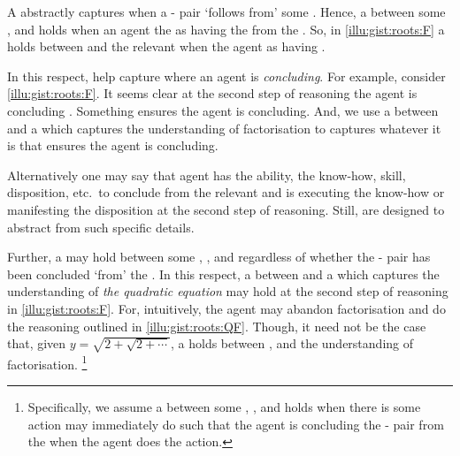 \begin{note}
  A \emph{} abstractly captures when a - pair `follows from' some \pool{}.
  Hence, a \ros{} between some ,  and  holds when an agent \eval{} the \prop{} as having the  from the .
  So, in \autoref{illu:gist:roots:F} a \ros{} holds between  and the relevant \pool{} when the agent \evals{} \propM{\rootsCon{}} as having  .

  In this respect,  help capture where an agent is \emph{concluding}.
  For example, consider \autoref{illu:gist:roots:F}.
  It seems clear at the second step of reasoning the agent is concluding .
  Something ensures the agent is concluding.
  And, we use a \ros{} between  and a \pool{} which captures the \agents{} understanding of factorisation to captures whatever it is that ensures the agent is concluding.

  Alternatively one may say that agent has the ability, the know-how, skill, disposition, etc.\ to conclude  from the relevant \pool{} and is executing the know-how or manifesting the disposition at the second step of reasoning.
  Still,  are designed to abstract from such specific details.

  Further, a  may hold between some , , and \pool{} regardless of whether the - pair has been concluded `from' the \pool{}.
  In this respect, a \ros{} between  and a \pool{} which captures the \agents{} understanding of \emph{the quadratic equation} may hold at the second step of reasoning in \autoref{illu:gist:roots:F}.
  For, intuitively, the agent may abandon factorisation and do the reasoning outlined in \autoref{illu:gist:roots:QF}.
  Though, it need not be the case that, given \(y = \sqrt{ 2 + \sqrt{2 + \cdots}}\), a \ros{} holds between , and the \agents{} understanding of factorisation.%
  \footnote{
    Specifically, we assume a \ros{} between some , , and  holds when there is some action may immediately do such that the agent is concluding the - pair from the \pool{} when the agent does the action.
  }
\end{note}


